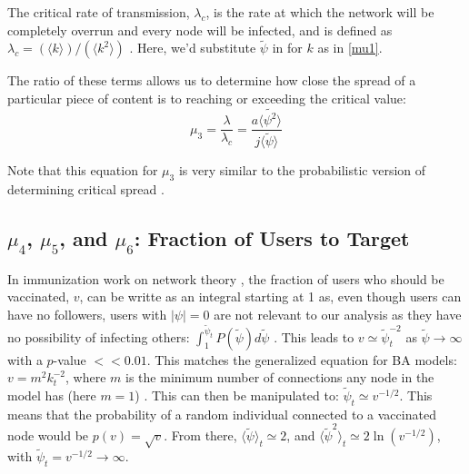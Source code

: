 \documentclass[preprint,12pt]{elsarticle}
\begin{document}
The critical rate of transmission, $\lambda_c$, is the rate at which the network will be completely overrun and every node will be infected, and is defined as $\lambda_c = (\langle k \rangle)/(\langle k^2 \rangle)$ \cite{pastor2001dynamics,pastor2001epidemic}. Here, we'd substitute $\tilde{\psi}$ in for $k$ as in \ref{mu1}.

The ratio of these terms allows us to determine how close the spread of a particular piece of content is to reaching or exceeding the critical value:
\begin{equation}
\label{mu_3 equation}
    \mu_3 = \frac{\lambda}{\lambda_c} = \frac{a \langle \tilde{\psi^2} \rangle}{j\langle \tilde{\psi} \rangle}
\end{equation}

Note that this equation for $\mu_3$ is very similar to the probabilistic version of determining critical spread \cite{newman2005threshold,ferrari2006network,meyers2005network,callaway2000network,newman2002random}.

\subsection{$\mu_4$, $\mu_5$, and $\mu_6$: Fraction of Users to Target}
In immunization work on network theory \cite{pastor2002immunization}, the fraction of users who should be vaccinated, $v$, can be writte as an integral starting at 1 as, even though users can have no followers, users with $|\psi| = 0$ are not relevant to our analysis as they have no possibility of infecting others: $\int_1^{\tilde{\psi}_{t}} P(\tilde{\psi})d\tilde{\psi}$ \cite{pastor2002immunization,cohen2001breakdown}. This leads to $v \simeq \tilde{\psi}_t^{-2}$ as $\tilde{\psi} \rightarrow \infty$ with a $p$-value $<< 0.01$. This matches the generalized equation for BA models: $v = m^2k_t^{-2}$, where $m$ is the minimum number of connections any node in the model has (here $m = 1$) \citep{pastor2001epidemic}. This can then be manipulated to: $\tilde{\psi}_t \simeq v^{-1/2}$. This means that the probability of a random individual connected to a vaccinated node would be $p(v) = \sqrt{v}$. From there, $\langle \tilde{\psi} \rangle_t \simeq 2$, and $\langle \tilde{\psi}^2 \rangle_t \simeq 2 \ln(v^{-1/2})$, with $\tilde{\psi}_t = v^{-1/2} \rightarrow \infty$.
\end{document}
